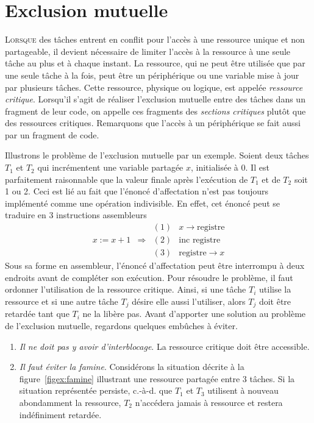 \chapter{Exclusion mutuelle}
\startchapter

\lettrine[lines=4]{L}{orsque} des tâches entrent en conflit pour l'accès à une ressource unique et non partageable, il devient nécessaire de limiter l'accès à la ressource à une seule tâche au plus et à chaque instant.  La ressource, qui ne peut être utilisée que par une seule tâche à la fois, peut être un périphérique ou une variable mise à jour par plusieurs tâches. Cette ressource, physique ou logique, est appelée {\em ressource critique}. Lorsqu'il s'agit de réaliser l'exclusion mutuelle entre des tâches dans un fragment de leur code, on appelle ces fragments des {\em sections critiques} plutôt que des ressources critiques. Remarquons que l'accès à un périphérique se fait aussi par un fragment de code.
\par
Illustrons le problème de l'exclusion mutuelle par un exemple.  Soient deux tâches $T_1$ et $T_2$ qui incrémentent une variable partagée $x$, initialisée à $0$.  Il est parfaitement raisonnable que la valeur finale après l'exécution de $T_1$ et de $T_2$ soit 1 ou 2.
Ceci est lié au fait que l'énoncé d'affectation n'est pas toujours implémenté comme une opération indivisible.  En effet, cet énoncé peut se traduire en 3 instructions assembleurs
\begin{displaymath}
\begin{array}{ccll}
       &                             & (1) & x \rightarrow \mbox{registre} \\
x:=x+1 & \Rightarrow & (2) & \mbox{inc registre} \\
       &                             & (3) & \mbox{registre} \rightarrow x
\end{array}
\end{displaymath}
Sous sa forme en assembleur, l'énoncé d'affectation peut être interrompu à deux endroits avant de compléter son exécution.  Pour résoudre le problème, il faut ordonner l'utilisation de la ressource critique.  Ainsi, si une tâche $T_i$ utilise la ressource et si une autre tâche $T_j$ désire elle aussi l'utiliser, alors $T_j$ doit
être retardée tant que $T_i$ ne la libère pas.
\noindent
Avant d'apporter une solution au problème de l'exclusion mutuelle, regardons quelques embûches à éviter.
\begin{enumerate}
\item {\em Il ne doit pas y avoir d'interblocage}.  La ressource critique doit être accessible.
\item {\em Il faut éviter la famine}.  Considérons la situation décrite à la figure~\ref{figex:famine} illustrant une ressource partagée entre 3 tâches.
 Si la situation représentée persiste, c.-à-d. que $T_1$ et $T_3$ utilisent à nouveau abondamment la ressource, $T_2$ n'accédera jamais à ressource et restera indéfiniment retardée.
\end{enumerate}


